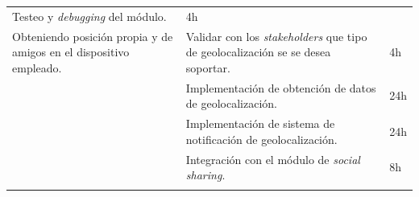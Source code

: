\begin{longtable}[c]{@{}lll@{}}
\begin{minipage}[t]{0.62\columnwidth}
Testeo y \emph{debugging} del módulo.
\end{minipage} & \begin{minipage}[t]{0.10\columnwidth}\raggedright
4h
\end{minipage}
\\\noalign{\medskip}
\begin{minipage}[t]{0.28\columnwidth}\raggedright
Obteniendo posición propia y de amigos en el dispositivo empleado.
\end{minipage} & \begin{minipage}[t]{0.62\columnwidth}\raggedright
Validar con los \emph{stakeholders} que tipo de geolocalización se se
desea soportar.
\end{minipage} & \begin{minipage}[t]{0.10\columnwidth}\raggedright
4h
\end{minipage}
\\\noalign{\medskip}
\begin{minipage}[t]{0.28\columnwidth}\raggedright
\end{minipage} & \begin{minipage}[t]{0.62\columnwidth}\raggedright
Implementación de obtención de datos de geolocalización.
\end{minipage} & \begin{minipage}[t]{0.10\columnwidth}\raggedright
24h
\end{minipage}
\\\noalign{\medskip}
\begin{minipage}[t]{0.28\columnwidth}\raggedright
\end{minipage} & \begin{minipage}[t]{0.62\columnwidth}\raggedright
Implementación de sistema de notificación de geolocalización.
\end{minipage} & \begin{minipage}[t]{0.10\columnwidth}\raggedright
24h
\end{minipage}
\\\noalign{\medskip}
\begin{minipage}[t]{0.28\columnwidth}\raggedright
\end{minipage} & \begin{minipage}[t]{0.62\columnwidth}\raggedright
Integración con el módulo de \emph{social sharing}.
\end{minipage} & \begin{minipage}[t]{0.10\columnwidth}\raggedright
8h
\end{minipage}
\\\noalign{\medskip}

\end{longtable}
